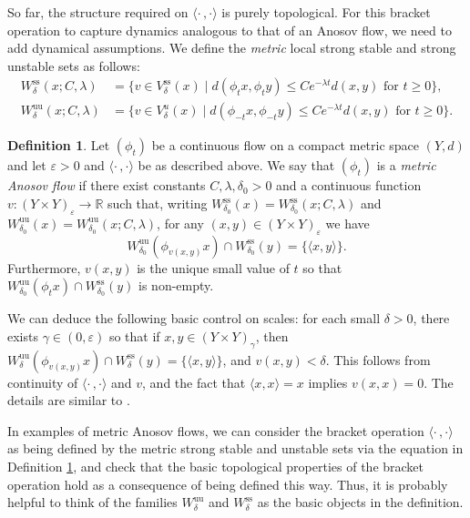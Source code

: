 \documentclass[11pt]{article}
\let\epsilon\varepsilon
\let\sep\mid
\newcommand{\lrangle}{\langle\cdot\,,\cdot\rangle}
\newcommand{\sts}{\mathrm{ss}}
\newcommand{\uu}{\mathrm{uu}}
\theoremstyle{definition}
\newtheorem{defn}[thm]{Definition}
\numberwithin{equation}{section}
\begin{document}
So far, the structure required on $\lrangle$ is purely topological. For this bracket operation to capture dynamics analogous to that of an Anosov flow, we need to add dynamical assumptions.
We define the \emph{metric} local strong stable and strong unstable sets as follows:
\begin{align*}
W^{\sts}_\delta (x; C, \lambda) &= \{ v \in V^{\sts}_\delta (x) \sep d(\phi_t x, \phi_t y) \leq Ce^{-\lambda t}d(x,y) \text{ for } t \geq 0\},\\
W^{\uu}_\delta (x; C, \lambda) &= \{ v \in V^{u}_\delta (x) \sep d(\phi_{-t} x, \phi_{-t} y) \leq Ce^{-\lambda t}d(x,y) \text{ for } t \geq 0\}.
\end{align*}

\begin{defn}\label{defn:metric anosov}
Let $(\phi_t)$ be a continuous flow on a compact metric space $(Y,d)$ and let $\epsilon>0$ and $\lrangle$ be as described above. We say that $(\phi_t)$ is a \emph{metric Anosov flow} if there exist constants $C, \lambda, \delta_0>0$ and a continuous function $v\colon(Y\times Y)_\epsilon \to \mathbb{R}$ such that, writing $W^{\sts}_{\delta_0} (x) = W^{\sts}_{\delta_0} (x; C, \lambda)$ and $W^{\uu}_{\delta_0} (x) = W^{\uu}_{\delta_0} (x; C, \lambda)$, for any $(x, y) \in (Y \times Y)_\epsilon$ we have
\[ W^{\uu}_{\delta_0}(\phi_{v(x,y)}x) \cap W^{\sts}_{\delta_0}(y) = \{\langle x,y\rangle \}. \]
Furthermore, $v(x,y)$ is the unique small value of $t$ so that $W^{\uu}_{\delta_0}(\phi_{t}x) \cap W^{\sts}_{\delta_0}(y)$ is non-empty.
\end{defn}

We can deduce the following basic control on scales: for each small $\delta>0$, there exists $\gamma\in(0, \epsilon)$ so that if $x,y \in (Y \times Y)_{\gamma}$, then $W^{\uu}_{\delta}(\phi_{v(x,y)}x) \cap W^{\sts}_{\delta}(y) = \{\langle x,y\rangle\}$, and $v(x,y)<\delta$. This follows from continuity of $\lrangle $ and $v$, and the fact that $\langle x,x\rangle =x$ implies $v(x,x)=0$. The details are similar to \cite[Lem.\,1.5]{bowen-periodic}.

In examples of metric Anosov flows, we can consider the bracket operation $\lrangle$ as being defined by the metric strong stable and unstable sets via the equation in Definition \ref{defn:metric anosov}, and check that the basic topological properties of the bracket operation hold as a consequence of being defined this way. Thus, it is probably helpful to think of the families $W^{\uu}_\delta$ and $W^{\sts}_\delta$ as the basic objects in the definition.
\end{document}

